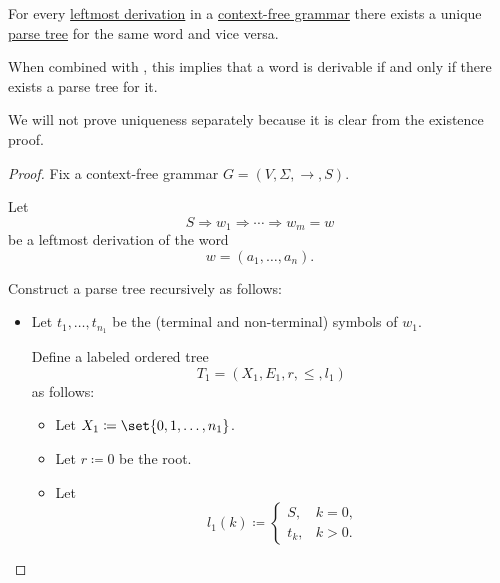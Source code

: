 \begin{proposition}\label{thm:derivations_and_parse_trees}
  For every \hyperref[def:leftmost_derivation]{leftmost derivation} in a \hyperref[def:chomsky_hierarchy/context_free]{context-free grammar} there exists a unique \hyperref[def:parse_tree]{parse tree} for the same word and vice versa.
\end{proposition}
\begin{comments}
  \item When combined with , this implies that a word is derivable if and only if there exists a parse tree for it.
  \item We will not prove uniqueness separately because it is clear from the existence proof.
\end{comments}
\begin{proof}
  Fix a context-free grammar \( G = (V, \Sigma, \to, S) \).

  \SufficiencySubProof Let
  \begin{equation*}
    S \Rightarrow w_1 \Rightarrow \cdots \Rightarrow w_m = w
  \end{equation*}
  be a leftmost derivation of the word
  \begin{equation*}
    w = (a_1, \ldots, a_n).
  \end{equation*}

  Construct a parse tree recursively as follows:
  \begin{itemize}
    \item Let \( t_1, \ldots, t_{n_1} \) be the (terminal and non-terminal) symbols of \( w_1 \).

    Define a labeled ordered tree
    \begin{equation*}
      T_1 = (X_1, E_1, r, \leq, l_1)
    \end{equation*}
    as follows:
    \begin{itemize}
      \item Let \( X_1 \coloneqq \set{ 0, 1, \ldots, n_1 } \).
      \item Let \( r \coloneqq 0 \) be the root.
      \item Let
      \begin{equation*}
        l_1(k) \coloneqq \begin{cases}
          S,   &k = 0, \\
          t_k, &k > 0.
        \end{cases}
      \end{equation*}


\end{itemize}
\end{itemize}
\end{proof}
